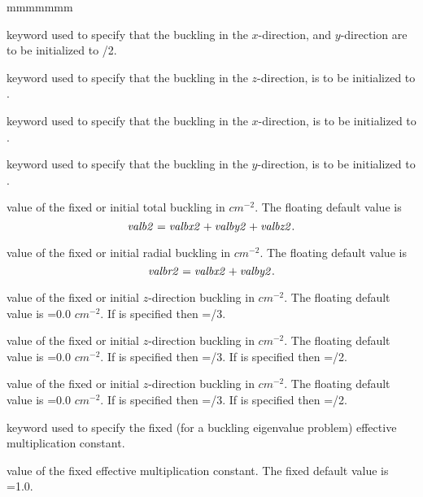 \begin{ListeDeDescription}{mmmmmmm}
\item[\moc{R}] keyword used to specify that the buckling in the $x$-direction,
and $y$-direction are to be initialized to /2.

\item[\moc{Z}] keyword used to specify that the buckling in the $z$-direction,
is to be initialized to .

\item[\moc{X}] keyword used to specify that the buckling in the $x$-direction,
is to be initialized to .

\item[\moc{Y}] keyword used to specify that the buckling in the $y$-direction,
is to be initialized to .

\item[\dusa{valb2}] value of the fixed or initial total buckling in $cm^{-2}$.
The floating default value is
$${\it valb2}={\it valbx2}+{\it valby2}+{\it valbz2}.$$

\item[\dusa{valbr2}] value of the fixed or initial radial buckling in
$cm^{-2}$. The floating default value is
$${\it valbr2}={\it valbx2}+{\it valby2}.$$

\item[\dusa{valbz2}] value of the fixed or initial $z$-direction buckling in
$cm^{-2}$. The floating default value is =0.0 $cm^{-2}$. If
 is specified then =/3.

\item[\dusa{valbx2}] value of the fixed or initial $z$-direction buckling in
$cm^{-2}$. The floating default value is =0.0 $cm^{-2}$. If
 is specified then =/3. If  is
specified then =/2.

\item[\dusa{valby2}] value of the fixed or initial $z$-direction buckling in
$cm^{-2}$. The floating default value is =0.0 $cm^{-2}$. If
 is specified then =/3. If  is
specified then =/2.

\item[\moc{KEFF}] keyword used to specify the fixed (for a buckling eigenvalue
problem) effective multiplication constant. 

\item[\dusa{valk}] value of the fixed effective multiplication constant. The
fixed default value is =1.0.


\end{ListeDeDescription}
